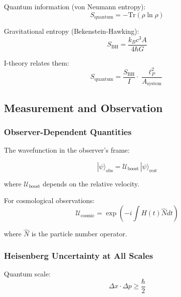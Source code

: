 Quantum information (von Neumann entropy):
\begin{equation}
\label{eq:quantum_entropy}
S_{\text{quantum}} = -\text{Tr}(\rho \ln \rho)
\end{equation}

Gravitational entropy (Bekenstein-Hawking):
\begin{equation}
\label{eq:gravitational_entropy}
S_{\text{BH}} = \frac{k_B c^3 A}{4\hbar G}
\end{equation}

I-theory relates them:
\begin{equation}
\label{eq:entropy_relation}
S_{\text{quantum}} = \frac{S_{\text{BH}}}{I} \cdot \frac{\ell_P^2}{A_{\text{system}}}
\end{equation}

\subsection{Measurement and Observation}

\subsubsection{Observer-Dependent Quantities}

The wavefunction in the observer's frame:

\begin{equation}
\label{eq:observer_wavefunction}
|\psi\rangle_{\text{obs}} = \mathcal{U}_{\text{boost}} \, |\psi\rangle_{\text{rest}}
\end{equation}

where $\mathcal{U}_{\text{boost}}$ depends on the relative velocity.

For cosmological observations:
\begin{equation}
\label{eq:cosmological_boost}
\mathcal{U}_{\text{cosmic}} = \exp\left(-i \int H(t) \hat{N} dt\right)
\end{equation}

where $\hat{N}$ is the particle number operator.

\subsubsection{Heisenberg Uncertainty at All Scales}

Quantum scale:
\begin{equation}
\label{eq:uncertainty_quantum}
\Delta x \cdot \Delta p \geq \frac{\hbar}{2}
\end{equation}

